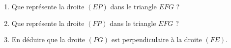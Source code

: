 
\begin{exercice}\label{exosmath-0931}

    \begin{multicols}{2}

\begin{center}
   
\end{center}

\columnbreak

    \begin{enumerate}
        \item
            Que représente la droite \( (EP)\) dans le triangle \( EFG\) ?
        \item
            Que représente la droite \( (FP)\) dans le triangle \( EFG\) ?
        \item
            En déduire que la droite \( (PG)\) est perpendiculaire à la droite \( (FE)\).
    \end{enumerate}

    \end{multicols}
\end{exercice}
